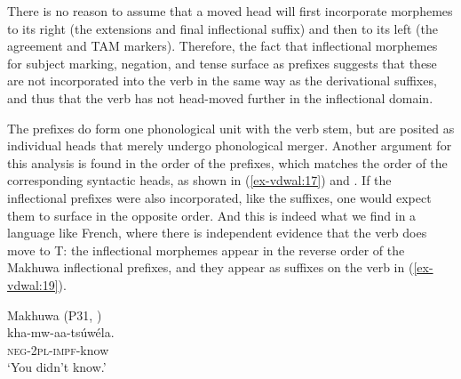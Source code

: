 \documentclass[output=paper
,modfonts
,nonflat]{langsci/langscibook}
\begin{document}
There is no reason to assume that a moved head will first incorporate morphemes to its right (the extensions and final inflectional suffix) and then to its left (the agreement and TAM markers). Therefore, the fact that inflectional morphemes for subject marking, negation, and tense surface as prefixes suggests that these are not incorporated into the verb in the same way as the derivational suffixes, and thus that the verb has not head-moved further in the inflectional domain.

The prefixes do form one phonological unit with the verb stem, but are posited as individual heads that merely undergo phonological merger. Another argument for this analysis is found in the order of the prefixes, which matches the order of the corresponding syntactic heads, as shown in (\ref{ex-vdwal:17}) and . If the inflectional prefixes were also incorporated, like the suffixes, one would expect them to surface in the opposite order. And this is indeed what we find in a language like French, where there is independent evidence that the verb does move to T: the inflectional morphemes appear in the reverse order of the Makhuwa inflectional prefixes, and they appear as suffixes on the verb in (\ref{ex-vdwal:19}). 

\begin{exe}
		\ex Makhuwa (P31, \citealt[169]{Van_der_Wal2009})\label{ex-vdwal:17} \\
		\gll kha-mw-aa-tsúwéla.\\
		\textsc{neg}-\textsc{2pl}-\textsc{impf}-know\\
		\glt `You didn’t know.'
\end{exe}
\end{document}
